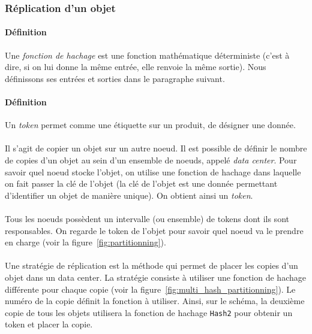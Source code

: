 \documentclass[12pt]{article}
\begin{document}
\subsubsection{Réplication d'un objet}


\paragraph{Définition} Une \textit{fonction de hachage} est une fonction mathématique déterministe (c'est à dire, si on lui donne la même entrée, elle renvoie la même sortie). Nous définissons ses entrées et sorties dans le paragraphe suivant.

\paragraph{Définition} Un \textit{token} permet comme une étiquette sur un produit, de désigner une donnée.

\paragraph{} Il s'agit de copier un objet sur un autre noeud. 
Il est possible de définir le nombre de copies d'un objet au sein d'un ensemble de noeuds, appelé \textit{data center}. 
Pour savoir quel noeud stocke l'objet, on utilise une fonction de hachage dans laquelle on fait passer la clé de l'objet (la clé de l'objet est une donnée permettant d'identifier un objet de manière unique).
On obtient ainsi un \textit{token}.

\paragraph{} Tous les noeuds possèdent un intervalle (ou ensemble) de tokens dont ils sont responsables. 
On regarde le token de l'objet pour savoir quel noeud va le prendre en charge (voir la figure~\ref{fig:partitionning}).

\paragraph{} Une stratégie de réplication est la méthode qui permet de placer les copies d'un objet dans un data center.
La stratégie consiste à utiliser une fonction de hachage différente pour chaque copie (voir la figure~\ref{fig:multi_hash_partitionning}). 
Le numéro de la copie définit la fonction à utiliser. 
Ainsi, sur le schéma, la deuxième copie de tous les objets utilisera la fonction de hachage \texttt{Hash2} pour obtenir un token et placer la copie.
\end{document}
